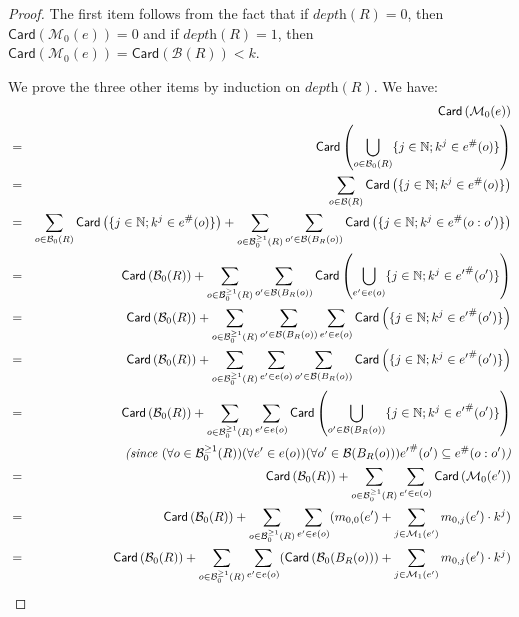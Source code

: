 \documentclass{article}
\theoremstyle{plain}
\newcommand{\Nat}{\ensuremath{\mathbb{N}}}
\newcommand{\Card}[1]{\textsf{Card}\left( #1 \right)}
\newcommand{\boxes}[1]{\mathcal{B}(#1)}
\newcommand{\boxesatzero}[1]{\mathcal{B}_{0}(#1)}
\newcommand{\boxesatzerogeq}[2]{\mathcal{B}_0^{\geq #2}(#1)}
\begin{document}
\begin{proof}
The first item follows from the fact that if $\textit{depth}(R) = 0$, then $\Card{\mathcal{M}_0(e)} = 0$ and if $\textit{depth}(R) = 1$, then $\Card{\mathcal{M}_0(e)} = \Card{\boxes{R}{}} < k$. 

We prove the three other items by induction on $\textit{depth}(R)$. We have:
\begin{eqnarray*}
& & \Card{\mathcal{M}_0(e)} \\
& = & \Card{\bigcup_{o \in \boxesatzero{R}} \{ j \in \Nat ; k^j \in e^\#(o) \}} \allowdisplaybreaks \\
& = & \sum_{o \in \boxes{R}{}} \Card{\{ j \in \Nat; k^j \in e^\#(o) \}} \allowdisplaybreaks \\
& = & \sum_{o \in \boxesatzero{R}} \Card{\{ j \in \Nat ; k^j \in e^\#(o) \}} + \sum_{o \in \boxesatzerogeq{R}{1}} \sum_{o' \in \boxes{B_R(o)}{}} \Card{\{ j \in \Nat; k^j \in e^\#(o:o') \}} \allowdisplaybreaks \\
& = & \Card{\boxesatzero{R}} + \sum_{o \in \boxesatzerogeq{R}{1}} \sum_{o' \in \boxes{B_R(o)}{}} \Card{\bigcup_{e' \in e(o)} \{ j \in \Nat; k^j \in {e'}^\#(o') \}} \allowdisplaybreaks \\
& = & \Card{\boxesatzero{R}} + \sum_{o \in \boxesatzerogeq{R}{1}} \sum_{o' \in \boxes{B_R(o)}{}} \sum_{e' \in e(o)} \Card{\{ j \in \Nat; k^j \in {e'}^\#(o') \}} \allowdisplaybreaks \\
& = & \Card{\boxesatzero{R}} + \sum_{o \in \boxesatzerogeq{R}{1}} \sum_{e' \in e(o)} \sum_{o' \in \boxes{B_R(o)}{}} \Card{\{ j \in \Nat; k^j \in {e'}^\#(o') \}} \allowdisplaybreaks \\
& = & \Card{\boxesatzero{R}} + \sum_{o \in \boxesatzerogeq{R}{1}} \sum_{e' \in e(o)} \Card{\bigcup_{o' \in \boxes{B_R(o)}{}} \{ j \in \Nat; k^j \in {e'}^\#(o') \}} \\
& & \textit{(since $(\forall o \in \boxesatzerogeq{R}{1}) (\forall e' \in e(o)) (\forall o' \in \boxes{B_R(o)}{}) {e'}^\#(o') \subseteq e^\#(o:o')$)} \allowdisplaybreaks \\
& = & \Card{\boxesatzero{R}} + \sum_{o \in \boxesatzerogeq{R}{1}} \sum_{e' \in e(o)} \Card{\mathcal{M}_0(e')} \allowdisplaybreaks \\
& = & \Card{\boxesatzero{R}} + \sum_{o \in \boxesatzerogeq{R}{1}} \sum_{e' \in e(o)} (m_{0, 0}(e') + \sum_{j \in \mathcal{M}_1(e')} m_{0, j}(e') \cdot k^j) \allowdisplaybreaks \\
& = & \Card{\boxesatzero{R}} + \sum_{o \in \boxesatzerogeq{R}{1}} \sum_{e' \in e(o)} (\Card{\boxesatzero{B_R(o)}} + \sum_{j \in \mathcal{M}_1(e')} m_{0, j}(e') \cdot k^j)  \\

\end{eqnarray*}
\end{proof}
\end{document}
